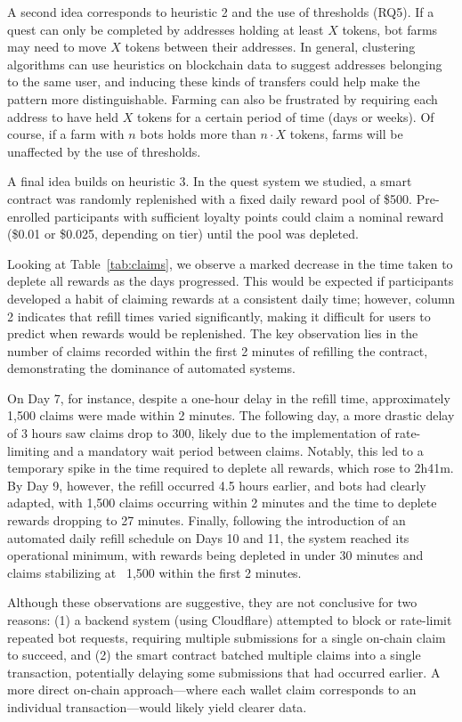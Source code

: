 A second idea corresponds to heuristic 2 and the use of thresholds (RQ5). If a quest can only be completed by addresses holding at least $X$ tokens, bot farms may need to move $X$ tokens between their addresses. In general, clustering algorithms can use heuristics on blockchain data to suggest addresses belonging to the same user, and inducing these kinds of transfers could help make the pattern more distinguishable. Farming can also be frustrated by requiring each address to have held $X$ tokens for a certain period of time (days or weeks). Of course, if a farm with $n$ bots holds more than $n\cdot X$ tokens, farms will be unaffected by the use of thresholds. 

A final idea builds on heuristic 3. In the quest system we studied, a smart contract was randomly replenished with a fixed daily reward pool of \$500. Pre-enrolled participants with sufficient loyalty points could claim a nominal reward (\$0.01 or \$0.025, depending on tier) until the pool was depleted. 



Looking at Table~\ref{tab:claims}, we observe a marked decrease in the time taken to deplete all rewards as the days progressed. This would be expected if participants developed a habit of claiming rewards at a consistent daily time; however, column 2 indicates that refill times varied significantly, making it difficult for users to predict when rewards would be replenished. The key observation lies in the number of claims recorded within the first 2 minutes of refilling the contract, demonstrating the dominance of automated systems.

On Day 7, for instance, despite a one-hour delay in the refill time, approximately 1,500 claims were made within 2 minutes. The following day, a more drastic delay of 3 hours saw claims drop to 300, likely due to the implementation of rate-limiting and a mandatory wait period between claims. Notably, this led to a temporary spike in the time required to deplete all rewards, which rose to 2h41m. By Day 9, however, the refill occurred 4.5 hours earlier, and bots had clearly adapted, with 1,500 claims occurring within 2 minutes and the time to deplete rewards dropping to 27 minutes. Finally, following the introduction of an automated daily refill schedule on Days 10 and 11, the system reached its operational minimum, with rewards being depleted in under 30 minutes and claims stabilizing at ~1,500 within the first 2 minutes.

Although these observations are suggestive, they are not conclusive for two reasons: (1) a backend system (using Cloudflare) attempted to block or rate-limit repeated bot requests, requiring multiple submissions for a single on-chain claim to succeed, and (2) the smart contract batched multiple claims into a single transaction, potentially delaying some submissions that had occurred earlier. A more direct on-chain approach—where each wallet claim corresponds to an individual transaction—would likely yield clearer data.

